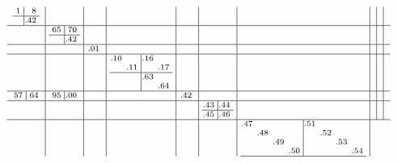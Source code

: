 \documentclass[12pt,a4paper,landscape]{amsart}
\begin{document}
\begin{align*}\scriptsize\arraycolsep3pt
  \begin{array}{c|c|c|c|c|c|c|c|c|c}
\begin{array}{r|r}%
 1& 8\\\hline%
  &\llap.42 \\%
\end{array}%
&&&&&&&&&\\\hline
&
\begin{array}{r|r}%
65&70\\\hline%
  &\llap.42 \\%
\end{array}%
&&&&&&&&\\\hline
&&
\begin{array}{r}%
\llap.01\\%
\end{array}%
&&&&&&&\\\hline
&&&
\begin{array}{rr|rr}%
\llap.10&  &\llap.16&  \\%
  &\llap.11&  &\llap.17\\\hline%
  &  &\llap.63&  \\%
  &  &  &\llap.64\\%
\end{array}%
&&&&&&\\\hline
\begin{array}{r|r}%
57&64\\%
\end{array}%
&
\begin{array}{r|r}%
95&\llap.00\\%
\end{array}%
&&&
\begin{array}{r}%
\llap.42\\%
\end{array}%
&&&&&\\\hline
&&&&&
\begin{array}{r|r}%
\llap.43&\llap.44\\\hline%
\llap.45&\llap.46\\%
\end{array}%
&&&&\\\hline
&&&&&&
\begin{array}{rrrr|rrrr}%
\llap.47&  &  &  &\llap.51&  &  &  \\%
  &\llap.48&  &  &  &\llap.52&  &  \\%
  &  &\llap.49&  &  &  &\llap.53&  \\%
  &  &  &\llap.50&  &  &  &\llap.54\\\hline%

\end{array}
\end{array}
\end{align*}
\end{document}
